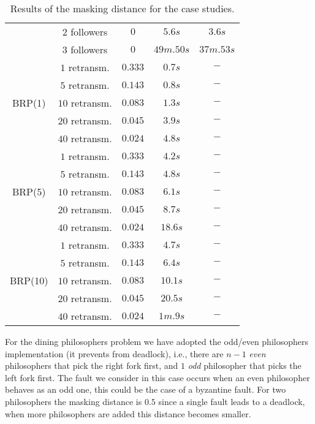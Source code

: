 \begin{table} [h]
{\begin{tabular}{|c|c|c|c|c|}
            & $2$ followers & $0$ & $5.6s$ & $3.6s$ \\ \cline{2-5}
            & $3$ followers & $0$ & $49m.50s$ & $37m.53s$ \\ \cline{2-5}
    \hline
 		\multirow{5}{*}{BRP(1)}       	& $1$ retransm. & $0.333$ & $0.7s$ & $-$\\ \cline{2-5}
 						& $5$ retransm. & $0.143$ & $0.8s$  & $-$\\ \cline{2-5}
 						& $10$ retransm. & $0.083$ & $1.3s$  & $-$\\ \cline{2-5}
 						& $20$ retransm. & $0.045$ & $3.9s$  & $-$\\ \cline{2-5}
 						& $40$ retransm. & $0.024$ & $4.8s$ & $-$ \\ \cline{2-5}
 		\hline
 		\multirow{5}{*}{BRP(5)}       	& $1$ retransm. & $0.333$ & $4.2s$ & $-$\\ \cline{2-5}
 						& $5$ retransm. & $0.143$ & $4.8s$  & $-$\\ \cline{2-5}
 						& $10$ retransm. & $0.083$ & $6.1s$  & $-$\\ \cline{2-5}
 						& $20$ retransm. & $0.045$ & $8.7s$  & $-$\\ \cline{2-5}
 						& $40$ retransm. & $0.024$ & $18.6s$ & $-$ \\ \cline{2-5}
 		\hline
 		\multirow{5}{*}{BRP(10)}       	& $1$ retransm. & $0.333$ & $4.7s$ & $-$\\ \cline{2-5}
 						& $5$ retransm. & $0.143$ & $6.4s$ & $-$ \\ \cline{2-5}
 						& $10$ retransm. & $0.083$ & $10.1s$ & $-$ \\ \cline{2-5}
 						& $20$ retransm. & $0.045$ & $20.5s$ & $-$ \\ \cline{2-5}
 						& $40$ retransm. & $0.024$ & $1m.9s$ & $-$ \\ \cline{2-5}
 		\hline
 	\end{tabular}}
 	\caption{Results of the masking distance for the case studies.}
 	\label{table:results}
		
 \end{table}

For the dining philosophers problem we have adopted the odd/even philosophers implementation (it prevents from deadlock), i.e.,  there are 
$n-1$ \emph{even} philosophers that pick the right fork first, and $1$ \emph{odd} philosopher that picks the left fork first. The fault we consider in this case occurs when
an even philosopher behaves as an odd one, this could be the case of a byzantine fault. For two philosophers the masking distance is $0{.}5$ since a single fault leads to a deadlock, when more philosophers are added this distance becomes smaller. 

